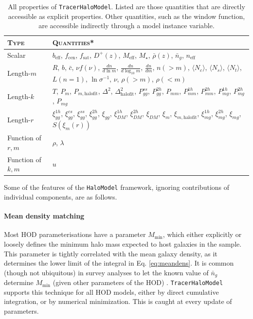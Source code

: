 \documentclass[5p,aas_macros]{elsarticle}
\newcommand{\Nc}{\langle N_c \rangle}
\newcommand{\Ns}{\langle N_s \rangle}
\newcommand{\Nt}{\langle N_t \rangle}
\begin{document}
\begin{table}
\centering
 {\tabulinesep=1mm
\begin{tabu} to \linewidth{X[1l]X[4.5l]} 
\toprule[0.05cm]
\textsc{Type} & \textsc{Quantities}*  \\
\toprule[0.05cm]
Scalar & $b_\text{eff}$, $f_\text{cen}$, $f_\text{sat}$, $D^+(z)$, $M_\text{eff}$, $M_\star$, $\bar{\rho}(z)$, $\bar{n}_g$, $n_\text{eff}$ \\
Length-$m$ & $R$, $b$, $\bar{c}$, $\nu f(\nu)$, $\frac{dn}{d\ln m}$, $\frac{dn}{d\log_{10} m}$, $\frac{dn}{d m}$, $n(>m)$, $\Nc$, $\Ns$, $\Nt$, $L(n=1)$, $\ln \sigma^{-1}$, $\nu$,  $\rho(>m)$, $\rho(<m)$ \\
Length-$k$ & $T$, $P_m$, $P_{m, \text{halofit}}$, $\Delta^2$, $\Delta^2_\text{halofit}$, $P_{gg}^{ss}$, $P_{gg}^{2h}$, $P_{mm}$, $P_{mm}^{1h}$, $P_{mm}^{2h}$, $P_{mg}^{1h}$, $P_{mg}^{2h}$, $P_{mg}$ \\
Length-$r$ & $\xi_{gg}^{1h}$, $\xi_{gg}^{cs}$, $\xi_{gg}^{ss}$, $\xi_{gg}^{2h}$, $\xi_{gg}$, $\xi_{DM}^{1h}$, $\xi_{DM}^{2h}$, $\xi_{DM}$, $\xi_m$, $\xi_{m, \text{halofit}}$, $\xi_{mg}^{1h}$, $\xi_{mg}^{2h}$, $\xi_{mg}$, $S(\xi_m(r))$ \\
Function of $r,m$ & $\rho$, $\lambda$ \\
Function of $k,m$ & $u$ \\
 
\bottomrule[0.05cm]
\end{tabu}}
\caption[All included properties of \texttt{TracerHaloModel}]{All properties of \texttt{TracerHaloModel}. Listed are those quantities that are directly accessible as explicit properties. Other quantities, such as the window function, are accessible indirectly through a model instance variable.}
\label{tab:halomodel_properties}
\end{table}


Some of the features of the \verb|HaloModel| framework, ignoring contributions of individual components, are as follows.

\paragraph*{Mean density matching} 
Most HOD parameterisations have a parameter $M_\text{min}$, which either explicitly or loosely defines the minimum halo mass expected to host galaxies in the sample. This parameter is tightly correlated with the mean galaxy density, as it determines the lower limit of the integral in Eq. \ref{eq:meandens}. It is common (though not ubiquitous) in survey analyses to let the known value of $\bar{n}_g$ determine $M_\text{min}$ (given other parameters of the HOD) \citep[eg][]{Beutler2013}. \verb|TracerHaloModel| supports this technique for all HOD models, either by direct cumulative integration, or by numerical minimization. This is caught at every update of parameters.
\end{document}
